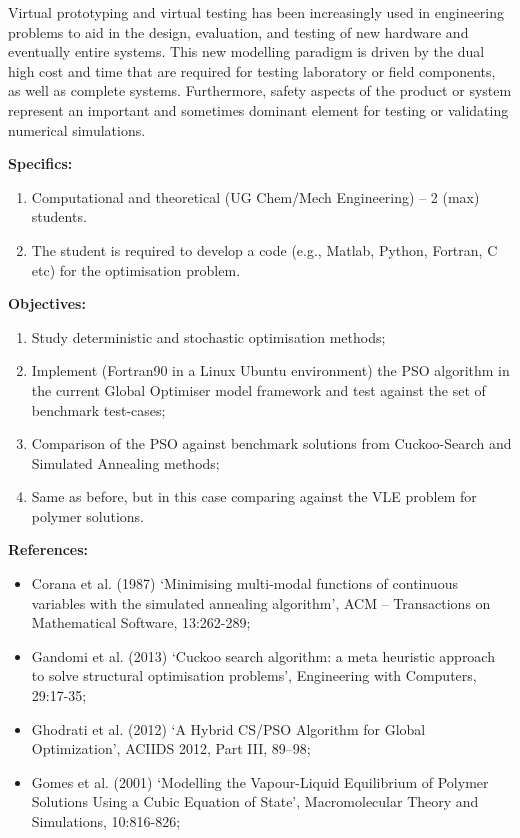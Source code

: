 \documentclass[12pts,a4paper,amsmath,amssymb,floatfix]{article}%
\newcommand{\Chem}{UG Chem/Mech Engineering}
\begin{document}
\begin{enumerate}[label=\bfseries Project: \arabic*:]
Virtual prototyping and virtual testing has been increasingly used in engineering problems to aid in the design, evaluation, and testing of new hardware and eventually entire systems. This new modelling paradigm is driven by the dual high cost and time that are required for testing laboratory or field components, as well as complete systems. Furthermore, safety aspects of the product or system represent an important and sometimes dominant element for testing or validating numerical simulations.


\noindent
{\bf Specifics:} 
\begin{enumerate}
\item Computational and theoretical (\Chem) -- 2 (max) students. 
\item The student is required to develop a code (e.g., Matlab, Python, Fortran, C etc) for the optimisation problem.
\end{enumerate} 



\noindent
{\bf Objectives:}
\begin{enumerate}
\item Study deterministic and stochastic optimisation methods;
\item Implement (Fortran90 in a Linux Ubuntu environment) the PSO algorithm in the current Global Optimiser model framework and test against the set of benchmark test-cases;
\item Comparison of the PSO against benchmark solutions from Cuckoo-Search and Simulated Annealing methods;
\item Same as before, but in this case comparing against the VLE problem for polymer solutions.  
\end{enumerate}


\noindent
{\bf References:}
\begin{itemize}
\item Corana et al. (1987) `Minimising multi-modal functions of continuous variables with the simulated annealing algorithm', ACM -- Transactions on Mathematical Software, 13:262-289;
\item Gandomi et al. (2013) `Cuckoo search algorithm: a meta heuristic approach to solve structural optimisation problems', Engineering with Computers, 29:17-35;
\item Ghodrati et al. (2012) `A Hybrid CS/PSO Algorithm for Global Optimization', ACIIDS 2012, Part III, 89–98;
\item Gomes et al. (2001) `Modelling the Vapour-Liquid Equilibrium of Polymer Solutions Using a Cubic Equation of State', Macromolecular Theory and Simulations, 10:816-826;
\end{itemize}


\end{enumerate}
\end{document}
